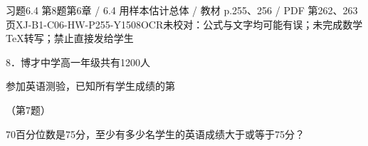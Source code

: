 \begin{bankitem}{习题6.4 第8题}{第6章 / 6.4 用样本估计总体 / 教材 p.255、256 / PDF 第262、263页}{XJ-B1-C06-HW-P255-Y1508}{OCR未校对：公式与文字均可能有误；未完成数学TeX转写；禁止直接发给学生}
\begin{ocrdraft}
\par
8．博才中学高一年级共有1200人
\par
参加英语测验，已知所有学生成绩的第
\par
（第7题）
\par
[教材p.256 / PDF第263页]
\par
70百分位数是75分，至少有多少名学生的英语成绩大于或等于75分？
\end{ocrdraft}
\end{bankitem}
